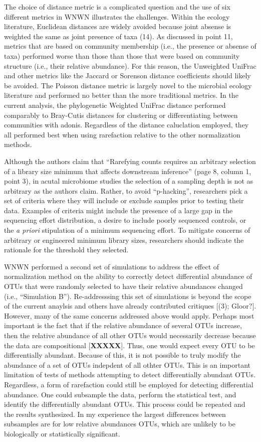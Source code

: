 \documentclass[
]{article}
\begin{document}
The choice of distance metric is a complicated question and the use of
six different metrics in WNWN illustrates the challenges. Within the
ecology literature, Euclidean distances are widely avoided because joint
absense is weighted the same as joint presence of taxa (14). As
discussed in point 11, metrics that are based on community membership
(i.e., the presence or absense of taxa) performed worse than those than
those that were based on community structure (i.e., their relative
abundance). For this reason, the Unweighted UniFrac and other metrics
like the Jaccard or Sorenson distance coefficients should likely be
avoided. The Poisson distance metric is largely novel to the microbial
ecology literature and performed no better than the more traditional
metrics. In the current analysis, the phylogenetic Weighted UniFrac
distance performed comparably to Bray-Cutis distances for clustering or
differentiating between communities with adonis. Regardless of the
distance caluclation employed, they all performed best when using
rarefaction relative to the other normalization methods.

Although the authors claim that ``Rarefying counts requires an arbitrary
selection of a library size minimum that affects downstream inference''
(page 8, column 1, point 3), in acutal microbiome studies the selection
of a sampling depth is not as arbitrary as the authors claim. Rather, to
avoid ``p-hacking'', researchers pick a set of criteria where they will
include or exclude samples prior to testing their data. Examples of
criteria might include the presence of a large gap in the sequencing
effort distribution, a desire to include poorly sequenced controls, or
the \emph{a priori} stipulation of a minimum sequencing effort. To
mitigate concerns of arbitrary or engineered minimum library sizes,
researchers should indicate the rationale for the threshold they
selected.

WNWN performed a second set of simulations to address the effect of
normalization method on the ability to correctly detect differential
abundance of OTUs that were randomly selected to have their relative
abundances changed (i.e., ``Simulation B''). Re-addresssing this set of
simulations is beyond the scope of the current anaylsis and others have
already contributed critiques {[}(3); Gloor?{]}. However, many of the
same concerns addressed above would apply. Perhaps most important is the
fact that if the relative abundance of several OTUs increase, then the
relative abundance of all other OTUs would necessarily decrease because
the data are compositional {[}\textbf{XXXXX}{]}. Thus, one would expect
every OTU to be differentially abundant. Because of this, it is not
possible to truly modify the abundance of a set of OTUs indepdent of all
othter OTUs. This is an important limitation of tests of methods
attempting to detect differentially abundant OTUs. Regardless, a form of
rarefaction could still be employed for detecting differential
abundance. One could subsample the data, perform the statistical test,
and identify the differentially abundant OTUs. This process could be
repeated and the results synthesized. In my experience the largest
differences between subsamples are for low relative abundances OTUs,
which are unlikely to be biologically or statistically significant.
\end{document}
